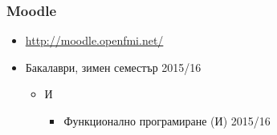 \documentclass{beamer}
\begin{document}
\begin{frame}
  \frametitle{Moodle}
  
  \begin{itemize}
  \item \url{http://moodle.openfmi.net/}
  \item Бакалаври, зимен семестър 2015/16
    \begin{itemize}
    \item И
      \begin{itemize}
      \item Функционално програмиране (И) 2015/16
      \end{itemize}
    \end{itemize}
  \end{itemize}
\end{frame}
\end{document}
